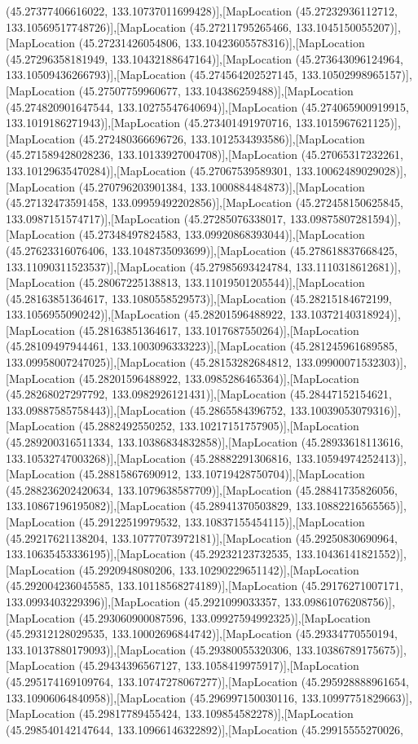 (45.27377406616022, 133.10737011699428)],[MapLocation (45.27232936112712, 133.10569517748726)],[MapLocation (45.27211795265466, 133.1045150055207)],[MapLocation (45.27231426054806, 133.10423605578316)],[MapLocation (45.27296358181949, 133.10432188647164)],[MapLocation (45.273643096124964, 133.10509436266793)],[MapLocation (45.274564202527145, 133.10502998965157)],[MapLocation (45.27507759960677, 133.104386259488)],[MapLocation (45.274820901647544, 133.10275547640694)],[MapLocation (45.274065900919915, 133.1019186271943)],[MapLocation (45.273401491970716, 133.1015967621125)],[MapLocation (45.272480366696726, 133.1012534393586)],[MapLocation (45.271589428028236, 133.10133927004708)],[MapLocation (45.27065317232261, 133.10129635470284)],[MapLocation (45.27067539589301, 133.10062489029028)],[MapLocation (45.270796203901384, 133.1000884484873)],[MapLocation (45.27132473591458, 133.09959492202856)],[MapLocation (45.272458150625845, 133.0987151574717)],[MapLocation (45.27285076338017, 133.09875807281594)],[MapLocation (45.27348497824583, 133.09920868393044)],[MapLocation (45.27623316076406, 133.1048735093699)],[MapLocation (45.278618837668425, 133.11090311523537)],[MapLocation (45.27985693424784, 133.1110318612681)],[MapLocation (45.28067225138813, 133.11019501205544)],[MapLocation (45.28163851364617, 133.1080558529573)],[MapLocation (45.28215184672199, 133.1056955090242)],[MapLocation (45.28201596488922, 133.10372140318924)],[MapLocation (45.28163851364617, 133.1017687550264)],[MapLocation (45.28109497944461, 133.1003096333223)],[MapLocation (45.281245961689585, 133.09958007247025)],[MapLocation (45.28153282684812, 133.09900071532303)],[MapLocation (45.28201596488922, 133.0985286465364)],[MapLocation (45.28268027297792, 133.0982926121431)],[MapLocation (45.28447152154621, 133.09887585758443)],[MapLocation (45.2865584396752, 133.10039053079316)],[MapLocation (45.2882492550252, 133.10217151757905)],[MapLocation (45.289200316511334, 133.10386834832858)],[MapLocation (45.28933618113616, 133.10532747003268)],[MapLocation (45.28882291306816, 133.10594974252413)],[MapLocation (45.28815867690912, 133.10719428750704)],[MapLocation (45.288236202420634, 133.1079638587709)],[MapLocation (45.28841735826056, 133.10867196195082)],[MapLocation (45.28941370503829, 133.10882216565565)],[MapLocation (45.29122519979532, 133.10837155454115)],[MapLocation (45.29217621138204, 133.10777073972181)],[MapLocation (45.29250830690964, 133.10635453336195)],[MapLocation (45.29232123732535, 133.10436141821552)],[MapLocation (45.2920948080206, 133.10290229651142)],[MapLocation (45.292004236045585, 133.10118568274189)],[MapLocation (45.29176271007171, 133.0993403229396)],[MapLocation (45.2921099033357, 133.09861076208756)],[MapLocation (45.293060900087596, 133.09927594992325)],[MapLocation (45.29312128029535, 133.10002696844742)],[MapLocation (45.29334770550194, 133.10137880179093)],[MapLocation (45.29380055320306, 133.10386789175675)],[MapLocation (45.29434396567127, 133.1058419975917)],[MapLocation (45.295174169109764, 133.10747278067277)],[MapLocation (45.295928888961654, 133.10906064840958)],[MapLocation (45.296997150030116, 133.10997751829663)],[MapLocation (45.29817789455424, 133.109854582278)],[MapLocation (45.298540142147644, 133.10966146322892)],[MapLocation (45.29915555270026, 